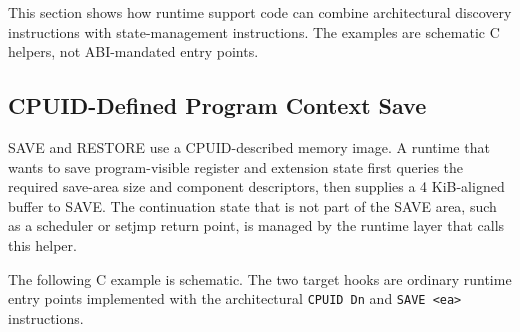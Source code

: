 This section shows how runtime support code can combine architectural discovery
instructions with state-management instructions. The examples are schematic C helpers,
not ABI-mandated entry points.

\subsection{CPUID-Defined Program Context Save}
SAVE and RESTORE use a CPUID-described memory image. A runtime that wants to save
program-visible register and extension state first queries the required save-area size
and component descriptors, then supplies a 4 KiB-aligned buffer to SAVE. The continuation
state that is not part of the SAVE area, such as a scheduler or setjmp return point, is
managed by the runtime layer that calls this helper.

The following C example is schematic. The two target hooks are ordinary runtime entry
points implemented with the architectural \texttt{CPUID Dn} and
\texttt{SAVE \textless{}ea\textgreater{}} instructions.


